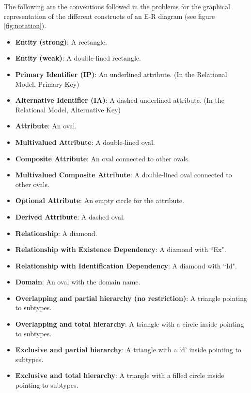 \documentclass{article}
\numberwithin{figure}{section}
\begin{document}
The following are the conventions followed in the problems for the graphical representation of the different constructs of an E-R diagram (see figure \ref{fig:notation}).

\begin{itemize}
    \item \textbf{Entity (strong)}: A rectangle.
    \item \textbf{Entity (weak)}: A double-lined rectangle.
    \item \textbf{Primary Identifier (IP)}: An underlined attribute. (In the Relational Model, Primary Key)
    \item \textbf{Alternative Identifier (IA)}: A dashed-underlined attribute. (In the Relational Model, Alternative Key)
    \item \textbf{Attribute}: An oval.
    \item \textbf{Multivalued Attribute}: A double-lined oval.
    \item \textbf{Composite Attribute}: An oval connected to other ovals.
    \item \textbf{Multivalued Composite Attribute}: A double-lined oval connected to other ovals.
    \item \textbf{Optional Attribute}: An empty circle for the attribute.
    \item \textbf{Derived Attribute}: A dashed oval.
    \item \textbf{Relationship}: A diamond.
    \item \textbf{Relationship with Existence Dependency}: A diamond with ``Ex".
    \item \textbf{Relationship with Identification Dependency}: A diamond with ``Id".
    \item \textbf{Domain}: An oval with the domain name.
    \item \textbf{Overlapping and partial hierarchy (no restriction)}: A triangle pointing to subtypes.
    \item \textbf{Overlapping and total hierarchy}: A triangle with a circle inside pointing to subtypes.
    \item \textbf{Exclusive and partial hierarchy}: A triangle with a `d' inside pointing to subtypes.
    \item \textbf{Exclusive and total hierarchy}: A triangle with a filled circle inside pointing to subtypes.
\end{itemize}
\end{document}
